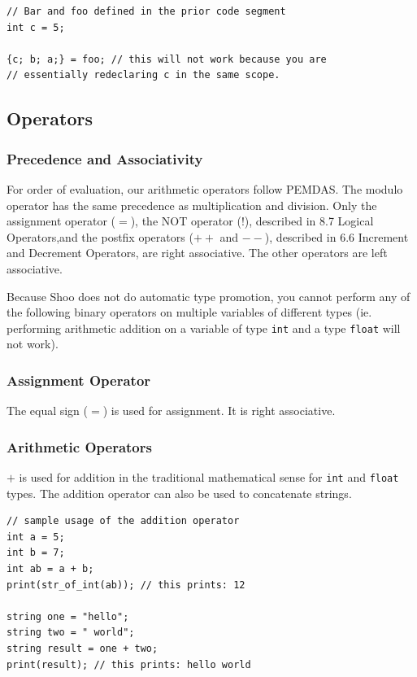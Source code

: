 \documentclass[12pt]{article}
\begin{document}
\begin{lstlisting}
// Bar and foo defined in the prior code segment
int c = 5;

{c; b; a;} = foo; // this will not work because you are
// essentially redeclaring c in the same scope.

\end{lstlisting}

\subsection{Operators}

\subsubsection{Precedence and Associativity}
For order of evaluation, our arithmetic operators follow PEMDAS. The modulo operator has the same precedence as multiplication and division. Only the assignment operator ($=$), the NOT operator ($!$), described in 8.7 Logical Operators,and the postfix operators ($++$ and $--$), described in 6.6 Increment and Decrement Operators, are right associative. The other operators are left associative. 

Because Shoo does not do automatic type promotion, you cannot perform any of the following binary operators on multiple variables of different types (ie. performing arithmetic addition on a variable of type \lstinline!int! and a type \lstinline!float! will not work).

\subsubsection{Assignment Operator}
The equal sign ($=$) is used for assignment. It is right associative.

\subsubsection{Arithmetic Operators}
$+$ is used for addition in the traditional mathematical sense for \lstinline!int! and \lstinline!float! types. The addition operator can also be used to concatenate strings.

\begin{lstlisting}
// sample usage of the addition operator
int a = 5;
int b = 7;
int ab = a + b; 
print(str_of_int(ab)); // this prints: 12

string one = "hello";
string two = " world";
string result = one + two;
print(result); // this prints: hello world
\end{lstlisting}
\end{document}
